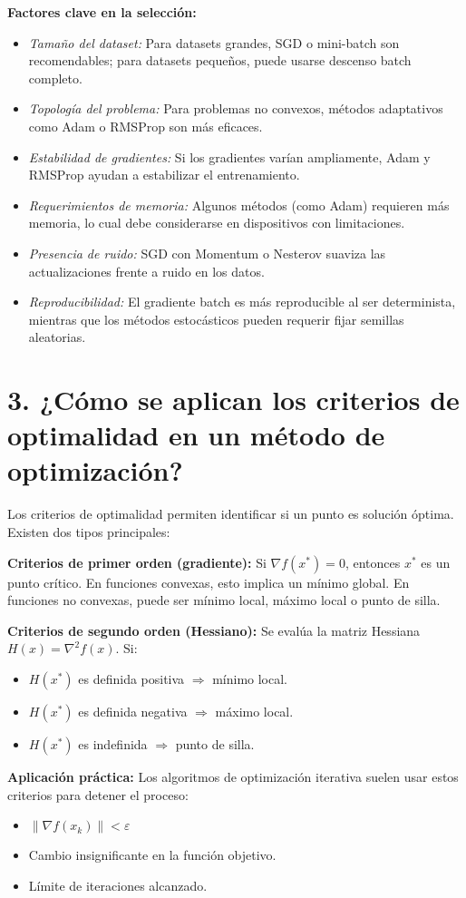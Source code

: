 \documentclass[a4paper,12pt]{article}
\begin{document}
	\textbf{Factores clave en la selección:}
	\begin{itemize}
		\item \textit{Tamaño del dataset:} Para datasets grandes, SGD o mini-batch son recomendables; para datasets pequeños, puede usarse descenso batch completo.
		\item \textit{Topología del problema:} Para problemas no convexos, métodos adaptativos como Adam o RMSProp son más eficaces.
		\item \textit{Estabilidad de gradientes:} Si los gradientes varían ampliamente, Adam y RMSProp ayudan a estabilizar el entrenamiento.
		\item \textit{Requerimientos de memoria:} Algunos métodos (como Adam) requieren más memoria, lo cual debe considerarse en dispositivos con limitaciones.
		\item \textit{Presencia de ruido:} SGD con Momentum o Nesterov suaviza las actualizaciones frente a ruido en los datos.
		\item \textit{Reproducibilidad:} El gradiente batch es más reproducible al ser determinista, mientras que los métodos estocásticos pueden requerir fijar semillas aleatorias.
	\end{itemize}
	
	\section*{3. ¿Cómo se aplican los criterios de optimalidad en un método de optimización?}
	Los criterios de optimalidad permiten identificar si un punto es solución óptima. Existen dos tipos principales:
	
	\textbf{Criterios de primer orden (gradiente):} Si $\nabla f(x^*) = 0$, entonces $x^*$ es un punto crítico. En funciones convexas, esto implica un mínimo global. En funciones no convexas, puede ser mínimo local, máximo local o punto de silla.
	
	\textbf{Criterios de segundo orden (Hessiano):} Se evalúa la matriz Hessiana $H(x) = \nabla^2 f(x)$. Si:
	\begin{itemize}
		\item $H(x^*)$ es definida positiva $\Rightarrow$ mínimo local.
		\item $H(x^*)$ es definida negativa $\Rightarrow$ máximo local.
		\item $H(x^*)$ es indefinida $\Rightarrow$ punto de silla.
	\end{itemize}
	
	\textbf{Aplicación práctica:} Los algoritmos de optimización iterativa suelen usar estos criterios para detener el proceso:
	\begin{itemize}
		\item $\|\nabla f(x_k)\| < \varepsilon$
		\item Cambio insignificante en la función objetivo.
		\item Límite de iteraciones alcanzado.
	\end{itemize}
	
\end{document}
